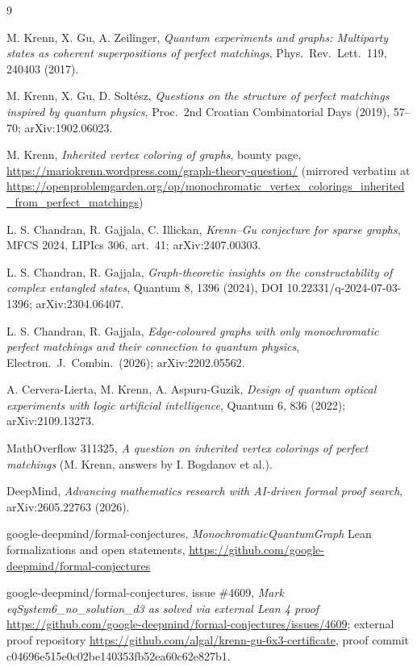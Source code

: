 \documentclass[11pt]{article}
\theoremstyle{definition}
\begin{document}

\begin{thebibliography}{9}

 M. Krenn, X. Gu, A. Zeilinger,
\emph{Quantum experiments and graphs: Multiparty states as coherent
superpositions of perfect matchings}, Phys.\ Rev.\ Lett.\ 119, 240403
(2017).

 M. Krenn, X. Gu, D. Solt\'esz,
\emph{Questions on the structure of perfect matchings inspired by
quantum physics}, Proc.\ 2nd Croatian Combinatorial Days (2019),
57--70; arXiv:1902.06023.

 M. Krenn, \emph{Inherited vertex coloring of graphs},
bounty page, \url{https://mariokrenn.wordpress.com/graph-theory-question/}
(mirrored verbatim at
\url{https://openproblemgarden.org/op/monochromatic_vertex_colorings_inherited_from_perfect_matchings})

 L. S. Chandran, R. Gajjala, C. Illickan,
\emph{Krenn--Gu conjecture for sparse graphs}, MFCS 2024, LIPIcs 306,
art.\ 41; arXiv:2407.00303.

 L. S. Chandran, R. Gajjala,
\emph{Graph-theoretic insights on the constructability of complex
entangled states}, Quantum 8, 1396 (2024),
DOI 10.22331/q-2024-07-03-1396; arXiv:2304.06407.

 L. S. Chandran, R. Gajjala,
\emph{Edge-coloured graphs with only monochromatic perfect matchings
and their connection to quantum physics}, Electron.\ J.\ Combin.\
(2026); arXiv:2202.05562.

 A. Cervera-Lierta, M. Krenn, A. Aspuru-Guzik,
\emph{Design of quantum optical experiments with logic artificial
intelligence}, Quantum 6, 836 (2022); arXiv:2109.13273.

 MathOverflow 311325, \emph{A question on
inherited vertex colorings of perfect matchings} (M. Krenn, answers by
I. Bogdanov et al.).

 DeepMind, \emph{Advancing mathematics research
with AI-driven formal proof search}, arXiv:2605.22763 (2026).

 google-deepmind/formal-conjectures,
\emph{MonochromaticQuantumGraph} Lean formalizations and open
statements, \url{https://github.com/google-deepmind/formal-conjectures}

 google-deepmind/formal-conjectures, issue \#4609,
\emph{Mark eqSystem6\_no\_solution\_d3 as solved via external Lean 4
proof}
\url{https://github.com/google-deepmind/formal-conjectures/issues/4609};
external proof repository
\url{https://github.com/algal/krenn-gu-6x3-certificate}, proof commit
c04696e515e0c02be140353fb52ea60c62e827b1.


\end{thebibliography}
\end{document}
